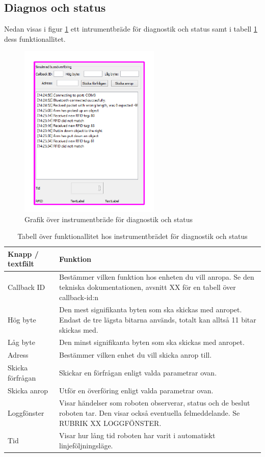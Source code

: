\documentclass[a4paper,12pt]{article}
\begin{document}
\subsection{Diagnos och status}
\label{subsec:diag}
Nedan visas i figur \ref{fig:pc_diag} ett intrumentbräde för diagnostik och status samt i tabell \ref{tab:diag} dess funktionallitet.

\begin{figure}[H]
	\centering
	\includegraphics[width=0.6\textwidth]{diag.pdf}
	\caption{Grafik över instrumentbräde för diagnostik och status}
	\label{fig:pc_diag}
\end{figure}

\begin{table}[H]
    \centering
    \begin{tabularx}{\textwidth}{|l|X|}
        \hline \textbf{Knapp / textfält} & \textbf{Funktion} \\ \hline
        Callback ID & Bestämmer vilken funktion hos enheten du vill anropa. Se den tekniska dokumentationen, avsnitt XX för en tabell över callback-id:n \\ \hline
        Hög byte & Den mest signifikanta byten som ska skickas med anropet. Endast de tre lägsta bitarna används, totalt kan alltså 11 bitar skickas med. \\ \hline
        Låg byte & Den minst signifikanta byten som ska skickas med anropet. \\ \hline
        Adress & Bestämmer vilken enhet du vill skicka anrop till. \\ \hline
        Skicka förfrågan & Skickar en förfrågan enligt valda parametrar ovan. \\ \hline
        Skicka anrop & Utför en överföring enligt valda parametrar ovan. \\ \hline
        Loggfönster & Visar händelser som roboten observerar, status och de beslut roboten tar. Den visar också eventuella felmeddelande. Se RUBRIK XX LOGGFÖNSTER.\\ \hline
        Tid & Visar hur lång tid roboten har varit i automatiskt linjeföljningsläge. \\ \hline
    \end{tabularx}
\caption{Tabell över funktionallitet hos instrumentbrädet för diagnostik och status}
\label{tab:diag}
\end{table}
\end{document}
